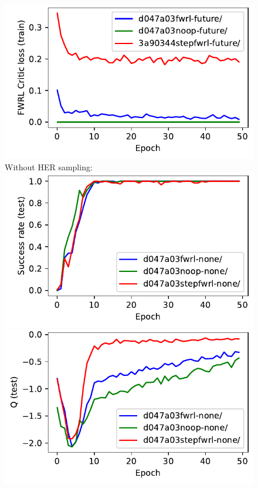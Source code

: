 \begin{figure}
  \includegraphics[width=\frac\columnwidth]{media/res/3a90344-FetchReach-v1-stepfwrl-future/train/critic_addnl_loss.pdf}\\
  Without HER sampling:\\
  \includegraphics[width=\frac\columnwidth]{media/res/d047a03-FetchReach-v1-stepfwrl-none/test/success_rate.pdf}%
  \includegraphics[width=\frac\columnwidth]{media/res/d047a03-FetchReach-v1-stepfwrl-none/test/mean_Q.pdf}%

\end{figure}
